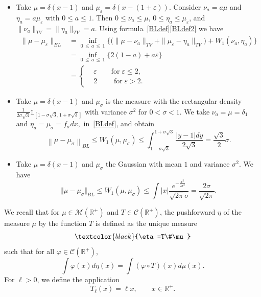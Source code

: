 \documentclass[AHL,Unicode,longabstracts,published]{cedram}
\newcommand*\dst{\displaystyle}
\newcommand*\eps{\varepsilon}
\newcommand*\R{\mathbb{R}}
\newcommand*\M{\mathcal{M}}
\newcommand*\f{\frac}
\newcommand{\clC}{\mathcal{C}}
\newcommand{\MT}[1]{\textcolor{black}{#1}}
\begin{document}
\begin{itemize}
\item Take $\mu=\delta(x-1)$ and $\mu_{\eps}=\delta(x-(1+\eps))$. Consider $\nu_a = a \mu$ and $\eta_a= a \mu_{\eps}$ with $0\leq a \leq 1$. Then $0 \leq \nu_a \leq \mu$, $0 \leq \eta_a \leq \mu_{\eps}$, and $\|\nu_a\|_{TV} =\|\eta_a\|_{TV} =a$. Using formula~\eqref{BLdef}\eqref{BLdef2} we have
\begin{equation*}
\begin{aligned}
\|\mu-\mu_{\eps}\|_{BL}& = \inf\limits_{0\,\leq\,a\,\leq\,1}
\Big\{\big(\|\mu-\nu_a\|_{TV} +\|\mu_{\eps}-\eta_a\|_{TV}\big) + W_1(\nu_a,\eta_a)
\Big\} \\
& = \inf\limits_{0\,\leq\,a\,\leq\,1}
\Big\{2(1-a) + a \eps
\Big\} \\
&=
\begin{cases}
& \eps\qquad\text{for}\;\eps\leq 2, \\
&2 \qquad \text{ for}\;\eps>2.
\end{cases}
\end{aligned}
\end{equation*}

\item Take $\mu=\delta(x-1)$ and $\mu_{\sigma}$ is the measure with the rectangular density $\f{1}{2\sigma\sqrt{3}}\mathbb{1}_{[1-\sigma\sqrt{3},1+\sigma\sqrt{3}]}$ with variance $\sigma^2$ for $0<\sigma<1$. We take $\nu_a=\mu=\delta_1$ and $\eta_a=\mu_\sigma=f_\sigma dx,$ in~\eqref{BLdef}, and obtain
\begin{equation*}
\left\|\mu-\mu_{\sigma}\right\|_{BL} \leq W_1(\mu,\mu_\sigma)\leq\int_{1-\sigma \sqrt{3}}^{1+\sigma \sqrt{3}} \f{\vert y-1 \vert dy}{2\sqrt{3}}=\f{\sqrt{3}}{2}\sigma.
\end{equation*}
\item Take $\mu=\delta(x-1)$ and $\mu_\sigma$ the Gaussian with mean $1$ and variance $\sigma^2.$ We have
\[
\Vert \mu - \mu_\sigma\Vert_{BL} \leq W_1(\mu,\mu_\sigma) \leq \int \vert x \vert \f{e^{-\f{x^2}{2\sigma^2}}}{\sqrt{2\pi}\sigma}=\f{2\sigma}{\sqrt{2\pi}}.
\]
\end{itemize}

We recall that for $\mu\in\M(\R^+)$ and $T\in \clC(\R^+)$, the pushforward $\eta$ of the measure $\mu$ by the function $T$ is defined as the unique measure
\begin{equation*}
\MT{\eta=T\#\mu}
\end{equation*}
such that for all $\varphi \in \clC(\R^+)$,
\begin{equation*}
\dst\int \varphi(x) d\eta(x) = \dst\int (\varphi\circ T)(x) d\mu(x).
\end{equation*}
For $\ell>0$, we define the application
\begin{equation}\label{Tell}
T_{\ell}(x) = \ell x, \qquad x\in \R^+.
\end{equation}
\end{document}
